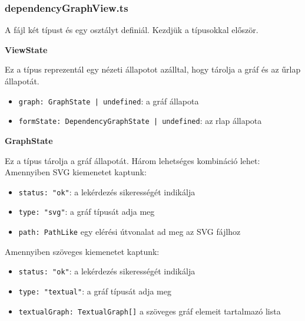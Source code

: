 \subsubsection{dependencyGraphView.ts}
 
\noindent A fájl két típust és egy osztályt definiál. Kezdjük a típusokkal először.




\vspace{14pt}
\noindent \textbf{ViewState}


\noindent Ez a típus reprezentál egy nézeti állapotot azálltal, hogy tárolja a gráf és az űrlap állapotát.

\begin{itemize}
    \item \lstinline{graph: GraphState | undefined}: a gráf állapota
    
    \item \lstinline{formState: DependencyGraphState | undefined}: az rlap állapota

\end{itemize}







\vspace{14pt}
\noindent\textbf{GraphState}


\noindent Ez a típus tárolja a gráf állapotát. Három lehetséges kombináció lehet:
\vspace{12pt}
\noindent Amennyiben SVG kiemenetet kaptunk:
\begin{itemize}
    \item \lstinline{status: "ok"}: a lekérdezés sikerességét indikálja
    \item \lstinline{type: "svg"}: a gráf típusát adja meg
    \item \lstinline{path: PathLike} egy elérési útvonalat ad meg az SVG fájlhoz
\end{itemize}

\noindent Amennyiben szöveges kiemenetet kaptunk:
\begin{itemize}
    \item \lstinline{status: "ok"}: a lekérdezés sikerességét indikálja
    \item \lstinline{type: "textual"}: a gráf típusát adja meg
    \item \lstinline{textualGraph: TextualGraph[]} a szöveges gráf elemeit tartalmazó lista
\end{itemize}


